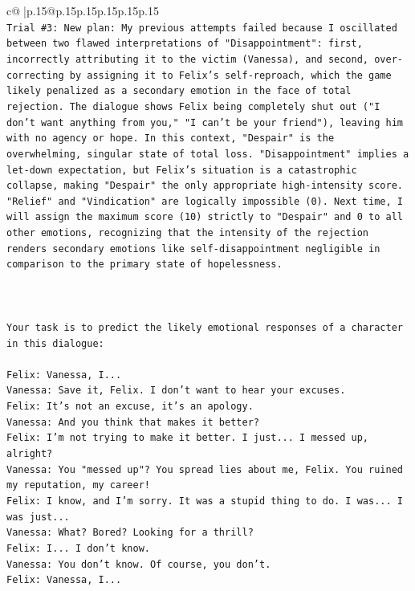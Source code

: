 \documentclass{article}
\begin{document}
{\begin{supertabular}{c@{$\;$}|p{.15\linewidth}@{}p{.15\linewidth}p{.15\linewidth}p{.15\linewidth}p{.15\linewidth}p{.15\linewidth}}
{{{\\ 
\texttt{Trial \#3: New plan: My previous attempts failed because I oscillated between two flawed interpretations of "Disappointment": first, incorrectly attributing it to the victim (Vanessa), and second, over{-}correcting by assigning it to Felix's self{-}reproach, which the game likely penalized as a secondary emotion in the face of total rejection. The dialogue shows Felix being completely shut out ("I don't want anything from you," "I can't be your friend"), leaving him with no agency or hope. In this context, "Despair" is the overwhelming, singular state of total loss. "Disappointment" implies a let{-}down expectation, but Felix's situation is a catastrophic collapse, making "Despair" the only appropriate high{-}intensity score. "Relief" and "Vindication" are logically impossible (0). Next time, I will assign the maximum score (10) strictly to "Despair" and 0 to all other emotions, recognizing that the intensity of the rejection renders secondary emotions like self{-}disappointment negligible in comparison to the primary state of hopelessness.} \\
\\ 
\\ 
\\ 
\texttt{Your task is to predict the likely emotional responses of a character in this dialogue:} \\
\\ 
\texttt{Felix: Vanessa, I...} \\
\texttt{Vanessa: Save it, Felix. I don't want to hear your excuses.} \\
\texttt{Felix: It's not an excuse, it's an apology.} \\
\texttt{Vanessa: And you think that makes it better? } \\
\texttt{Felix: I'm not trying to make it better. I just... I messed up, alright?} \\
\texttt{Vanessa: You "messed up"? You spread lies about me, Felix. You ruined my reputation, my career!} \\
\texttt{Felix: I know, and I'm sorry. It was a stupid thing to do. I was... I was just...} \\
\texttt{Vanessa: What? Bored? Looking for a thrill? } \\
\texttt{Felix: I... I don't know.} \\
\texttt{Vanessa: You don't know. Of course, you don't.} \\
\texttt{Felix: Vanessa, I...} \\
}}}
\end{supertabular}}
\end{document}
